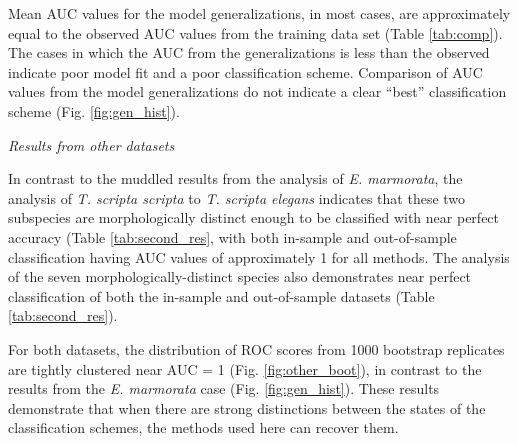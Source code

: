 \documentclass[12pt,letterpaper]{article}
\renewcommand{\subsection}[1]{%
\bigskip
\begin{center}
\begin{large}
\normalfont\itshape #1
\end{large}
\end{center}}
\begin{document}
Mean AUC values for the model generalizations, in most cases, are approximately equal to the observed AUC values from the training data set (Table \ref{tab:comp}). The  cases in which the AUC from the  generalizations is less than the observed indicate poor model fit and a poor classification scheme. Comparison of AUC values from the model generalizations do not indicate a clear ``best'' classification scheme (Fig. \ref{fig:gen_hist}). 


\subsection{Results from other datasets}

In contrast to the muddled results from the analysis of \textit{E. marmorata}, the analysis of \textit{T. scripta scripta} to \textit{T. scripta elegans} indicates that these two subspecies are morphologically distinct enough to be classified with near perfect accuracy (Table \ref{tab:second_res}, with both in-sample and out-of-sample classification having AUC values of approximately 1 for all methods. The analysis of the seven morphologically-distinct species also demonstrates near perfect classification of both the in-sample and out-of-sample datasets (Table \ref{tab:second_res}). 

For both datasets, the distribution of ROC scores from 1000 bootstrap replicates are tightly clustered near AUC = 1 (Fig. \ref{fig:other_boot}), in contrast to the results from the \textit{E. marmorata} case (Fig. \ref{fig:gen_hist}). These results demonstrate that when there are strong distinctions between the states of the classification schemes, the methods used here can recover them.
\end{document}
